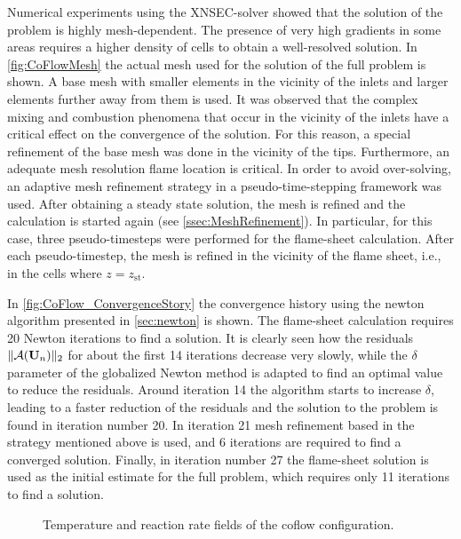 Numerical experiments using the XNSEC-solver showed that the solution of the problem is highly mesh-dependent. The presence of very high gradients in some areas requires a higher density of cells to obtain a well-resolved solution.  In \cref{fig:CoFlowMesh} the actual mesh used for the solution of the full problem is shown.  A base mesh with smaller elements in the vicinity of the inlets and larger elements further away from them is used. It was observed that the complex mixing and combustion phenomena that occur in the vicinity of the inlets have a critical effect on the convergence of the solution. For this reason, a special refinement of the base mesh was done in the vicinity of the tips. Furthermore, an adequate mesh resolution flame location is critical. In order to avoid over-solving, an adaptive mesh refinement strategy in a pseudo-time-stepping framework was used. After obtaining a steady state solution, the mesh is refined and the calculation is started again (see \cref{ssec:MeshRefinement}). In particular, for this case, three pseudo-timesteps were performed for the flame-sheet calculation. After each pseudo-timestep, the mesh is refined in the vicinity of the flame sheet, i.e., in the cells where $z = z_{\text{st}}$.


In \cref{fig:CoFlow_ConvergenceStory} the convergence history using the newton algorithm presented in \cref{sec:newton} is shown. The flame-sheet calculation requires 20 Newton iterations to find a solution. It is clearly seen how the residuals $\| \mathcal{A}(\textbf{U}_{n}) \|_2 $  for about the first 14 iterations decrease very slowly, while the $\delta$ parameter of the globalized Newton method is adapted to find an optimal value to reduce the residuals. Around iteration 14 the algorithm starts to increase $\delta$, leading  to a faster reduction of the residuals and the solution to the problem is found in iteration number 20. In iteration 21 mesh refinement based in the strategy mentioned above is used, and 6 iterations are required to find a converged solution. Finally, in iteration number 27 the flame-sheet solution is used as the initial estimate for the full problem, which requires only 11 iterations to find a solution.  




\begin{figure}[t!]
	\centering
	\pgfplotsset{width=0.6\textwidth, compat=1.3}
	\hspace{-2.4cm} 	
	\caption{Temperature and reaction rate fields of the coflow configuration.} \label{fig:CoFlowFlameFig}
\end{figure}




